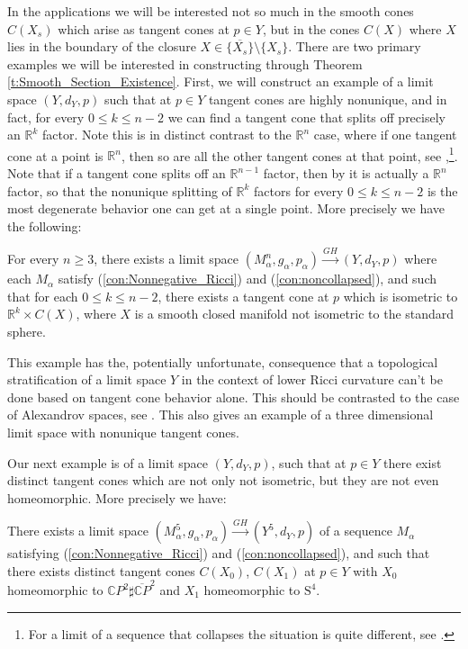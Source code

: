 \documentclass[11pt]{article}
\newcommand{\RR}{\mathds{R}}
\begin{document}
In the applications we will be interested not so much in the smooth cones $C(X_s)$ which arise as tangent cones at $p\in Y$, but in the cones $C(X)$ where $X$ lies in the boundary of the closure $X\in \overline{\{X_s\}}\setminus \{X_s\}$.  There are two primary examples we will be interested in constructing through Theorem \ref{t:Smooth_Section_Existence}.  First, we will construct an example of a limit space $(Y,d_Y,p)$ such that at $p\in Y$ tangent cones are highly nonunique, and in fact, for every $0\leq k\leq n-2$ we can find a tangent cone that splits off precisely an $\RR^{k}$ factor.  Note this is in distinct contrast to the $\RR^n$ case, where if one tangent cone at a point is $\RR^n$, then so are all the other tangent cones at that point, see \cite{A},\cite{C}\footnote{For a limit of a sequence that collapses the situation is quite different, see \cite{M2}.}.  Note that if a tangent cone splits off an $\RR^{n-1}$ factor, then by \cite{ChC2} it is actually a $\RR^n$ factor, so that the nonunique splitting of $\RR^{k}$ factors for every $0\leq k\leq n-2$ is the most degenerate behavior one can get at a single point.  More precisely we have the following:

\begin{theorem}\label{t:Example_Rk_splitting}
For every $n\geq 3$, there exists a limit space $(M_\alpha^n,g_\alpha,p_\alpha)\stackrel{GH}{\rightarrow} (Y,d_Y,p)$ where each $M_\alpha$ satisfy (\ref{con:Nonnegative_Ricci}) and (\ref{con:noncollapsed}), and such that for each $0\leq k\leq n-2$, there exists a tangent cone at $p$ which is isometric to $\RR^k\times C(X)$, where $X$ is a smooth closed manifold not isometric to the standard sphere.
\end{theorem}

This example has the, potentially unfortunate, consequence that a topological stratification of a limit space $Y$ in the context of lower Ricci curvature can't be done based on tangent cone behavior alone.  This should be contrasted to the case of Alexandrov spaces, see \cite{P3}.  This also gives an example of a three dimensional limit space with nonunique tangent cones.

Our next example is of a limit space $(Y,d_Y,p)$, such that at $p\in Y$ there exist distinct tangent cones which are not only not isometric, but they are not even homeomorphic.  More precisely we have:

\begin{theorem}\label{t:Example_nonhomeomorphic}
There exists a limit space $(M_\alpha^5,g_\alpha,p_\alpha)\stackrel{GH}{\rightarrow} (Y^5,d_Y,p)$ of a sequence $M_\alpha$ satisfying (\ref{con:Nonnegative_Ricci}) and (\ref{con:noncollapsed}), and such that there exists distinct tangent cones $C(X_0)$, $C(X_1)$ at $p\in Y$ with $X_0$ homeomorphic to $\mathds{C}P^2\sharp \overline{\mathds{C}P}^2$ and $X_1$ homeomorphic to $\text{S}^4$.
\end{theorem}
\end{document}
